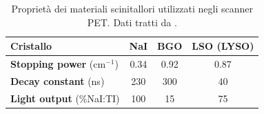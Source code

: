 \begin{table}[tbh]
	\centering
	\begin{tabular}{l|ccc}
		\hline
		\textbf{Cristallo} & NaI & BGO & LSO (LYSO) \\ \hline
		\textbf{Stopping power} ($\unit{\centi\meter}^{-1}$) & 0.34 & 0.92 & 0.87  \\ \hline
		\textbf{Decay constant} (\unit{\nano\second}) & 230 & 300 & 40 \\ \hline
		\textbf{Light output} (\%NaI:TI) & 100 & 15 & 75 \\ \hline
	\end{tabular}
	\caption{Proprietà dei materiali scinitallori utilizzati negli scanner PET. Dati tratti da \cite{RamseyDerek}.}
	\label{tab:scintillator_properties}
\end{table}

